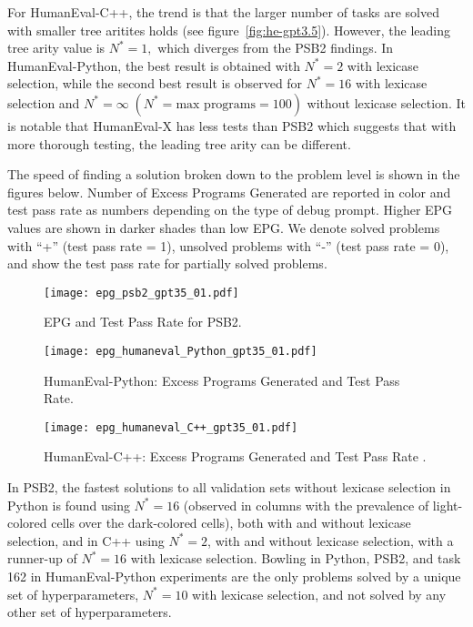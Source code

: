 For HumanEval-C++, the trend is that the larger number of tasks are solved with smaller tree aritites holds (see figure~\ref{fig:he-gpt3.5}). 
However, the leading tree arity value is $N^*=1,$ which diverges from the PSB2 findings. 
In HumanEval-Python, the best result is obtained with  $N^*=2$ with lexicase selection, while the second best result is observed for $N^*=16$ with lexicase  selection and $N^* = \infty \; (N^*=\text{max programs}=100)$ without lexicase selection.
It is notable that HumanEval-X has less tests than PSB2 which suggests that with more thorough testing, the leading tree arity can be different.

The speed of finding a solution broken down to the problem level is shown in the figures below. Number of Excess Programs Generated are reported in color and test pass rate as numbers depending on the type of debug prompt. Higher EPG values are shown in darker shades than low EPG. We denote solved problems with ``+'' (test pass rate = 1), unsolved problems with ``-'' (test pass rate = 0), and show the test pass rate for partially solved problems.

\begin{figure}[H]
  \centering
  \texttt{[image: epg\_psb2\_gpt35\_01.pdf]}
  \caption{EPG and Test Pass Rate for PSB2. }
  \label{fig:epg-psb2}
\end{figure}


\begin{figure}[H]
  \centering
  \texttt{[image: epg\_humaneval\_Python\_gpt35\_01.pdf]}
  \caption{HumanEval-Python: Excess Programs Generated and Test Pass Rate.}
  \label{fig:epg-humaneval-python}
\end{figure}

\begin{figure}[H]
  \centering
  \texttt{[image: epg\_humaneval\_C++\_gpt35\_01.pdf]}  %
  \caption{HumanEval-C++: Excess Programs Generated and Test Pass Rate .}
  \label{fig:epg-humaneval-c++}
\end{figure}

In PSB2, the fastest solutions to all validation sets without lexicase  selection in Python is found using $N^*=16$ (observed in columns with the prevalence of light-colored cells over the dark-colored cells), both with and without lexicase  selection, and in C++  using $N^*=2$, with and without lexicase selection, with a runner-up of $N^*=16$ with lexicase  selection.
Bowling in Python, PSB2, and task 162 in HumanEval-Python experiments are the only problems solved by a unique set of hyperparameters, $N^*=10$ with lexicase selection, and not solved by any other set of hyperparameters.

